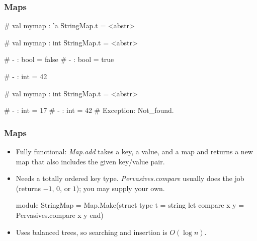 \documentclass{plt}
\begin{document}
\begin{frame}[fragile]
  \frametitle{Maps}

\begin{interactive}
# 
val mymap : 'a StringMap.t = <abstr>

# 
val mymap : int StringMap.t = <abstr>

# 
- : bool = false
# 
- : bool = true

# 
- : int = 42

# 
val mymap : int StringMap.t = <abstr>

# 
- : int = 17
# 
- : int = 42
# 
Exception: Not_found.
\end{interactive}
\end{frame}

\begin{frame}[fragile]
  \frametitle{Maps}

\begin{itemize}
\item Fully functional: \emph{Map.add} takes a key, a value, and a map
  and returns a new map that also includes the given key/value pair.

\item Needs a totally ordered key type. \emph{Pervasives.compare}
  usually does the job (returns $-1$, $0$, or $1$); you may
  supply your own.

\begin{minipage}{0.7\textwidth}
\begin{ocaml}
module StringMap = Map.Make(struct
  type t = string
  let compare x y = Pervasives.compare x y
end)
\end{ocaml}
\end{minipage}

\item Uses balanced trees, so searching and insertion is $O(\log n)$.

\end{itemize}

\end{frame}
\end{document}

